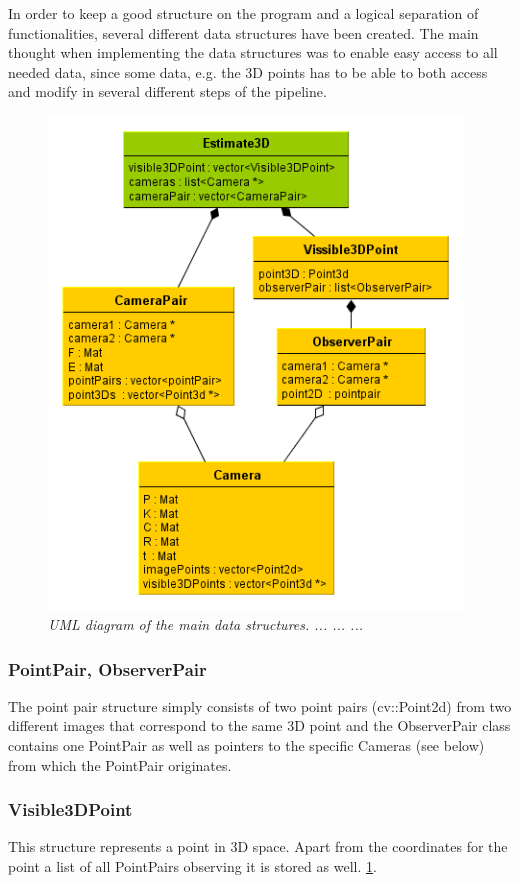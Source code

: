 In order to keep a good structure on the program and a logical separation of functionalities, several different data structures have been created. The main thought when implementing the data structures was to enable easy access to all needed data, since some data, e.g. the 3D points has to be able to both access and modify in several different steps of the pipeline.

\begin{figure}[htb]
	\centering
	\includegraphics[width=110mm]{images/data_structures_uml.png}
	\caption{\textit{UML diagram of the main data structures. ... ... ...}}
	\label{fig:UML_fig} %
\end{figure}



\subsubsection{PointPair, ObserverPair}
The point pair structure simply consists of two point pairs (cv::Point2d) from two different images that correspond to the same 3D point and the ObserverPair class contains one PointPair as well as pointers to the specific Cameras (see below) from which the PointPair originates. 

\subsubsection{Visible3DPoint}
This structure represents a point in 3D space. Apart from the coordinates for the point a list of all PointPairs observing it is stored as well.  \ref{fig:UML_fig}. %

